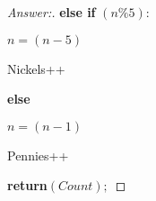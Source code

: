 \documentclass[11pt]{article}
\theoremstyle{definition}
\theoremstyle{definition}
\theoremstyle{definition}
\begin{document}
\begin{proof}[Answer:]
		\item	\hspace*{20mm} \textbf{else if} $(n \% 5):$
			\item	\hspace*{30mm} $n = (n-5)$
			\item	\hspace*{30mm} Nickels++
			
		\item	\hspace*{20mm} \textbf{else}
			\item	\hspace*{30mm} $n = (n-1)$
			\item	\hspace*{30mm} Pennies++
			
\item	\hspace*{10mm} \textbf{return}$(Count);$
\end{proof}



\newpage
\end{document}
